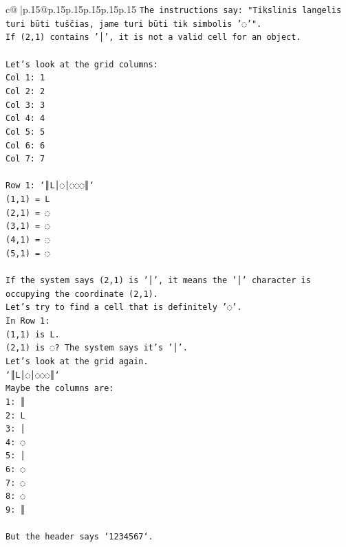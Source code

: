 \documentclass{article}
\begin{document}
{\begin{supertabular}{c@{$\;$}|p{.15\linewidth}@{}p{.15\linewidth}p{.15\linewidth}p{.15\linewidth}p{.15\linewidth}p{.15\linewidth}}
{{{\texttt{The instructions say: "Tikslinis langelis turi būti tuščias, jame turi būti tik simbolis '◌'".} \\
\texttt{If (2,1) contains '│', it is not a valid cell for an object.} \\
\\ 
\texttt{Let's look at the grid columns:} \\
\texttt{Col 1: 1} \\
\texttt{Col 2: 2} \\
\texttt{Col 3: 3} \\
\texttt{Col 4: 4} \\
\texttt{Col 5: 5} \\
\texttt{Col 6: 6} \\
\texttt{Col 7: 7} \\
\\ 
\texttt{Row 1: `║L│◌│◌◌◌║`} \\
\texttt{(1,1) = L} \\
\texttt{(2,1) = ◌} \\
\texttt{(3,1) = ◌} \\
\texttt{(4,1) = ◌} \\
\texttt{(5,1) = ◌} \\
\\ 
\texttt{If the system says (2,1) is '│', it means the '│' character is occupying the coordinate (2,1).} \\
\texttt{Let's try to find a cell that is definitely '◌'.} \\
\texttt{In Row 1:} \\
\texttt{(1,1) is L.} \\
\texttt{(2,1) is ◌? The system says it's '│'.} \\
\texttt{Let's look at the grid again.} \\
\texttt{`║L│◌│◌◌◌║`} \\
\texttt{Maybe the columns are:} \\
\texttt{1: ║} \\
\texttt{2: L} \\
\texttt{3: │} \\
\texttt{4: ◌} \\
\texttt{5: │} \\
\texttt{6: ◌} \\
\texttt{7: ◌} \\
\texttt{8: ◌} \\
\texttt{9: ║} \\
\\ 
\texttt{But the header says `1234567`.} \\
}}}
\end{supertabular}}
\end{document}
